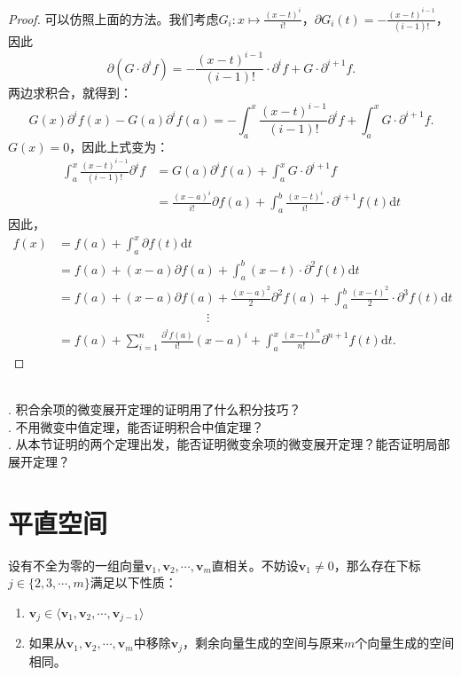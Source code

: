 \documentclass[12pt,UTF8,fontset=none]{ctexbook}
\begin{document}
\begin{appendix}
\begin{proof}
    可以仿照上面的方法。我们考虑$G_i: x\mapsto \frac{(x - t)^i}{i!}$，$\partial G_i(t) = -\frac{(x - t)^{i-1}}{(i-1)!}$，
    因此
    $$ \partial (G\cdot \partial^i f) = -\frac{(x - t)^{i-1}}{(i-1)!} \cdot \partial^i f + G \cdot \partial^{i+1} f. $$
    两边求积合，就得到：
    $$ G(x) \partial^i f(x) - G(a) \partial^i f(a) = - \int_a^x \frac{(x - t)^{i-1}}{(i-1)!} \partial^i f + \int_a^x G \cdot \partial^{i+1} f. $$
    $G(x) = 0$，因此上式变为：
    \begin{align*}
        \int_a^x \frac{(x - t)^{i-1}}{(i-1)!}\partial^i f & = G(a) \partial^i f(a)  + \int_a^x G \cdot \partial^{i+1} f \\
        & = \frac{(x - a)^i}{i!} \partial f(a) + \int_a^b \frac{(x - t)^i}{i!}\cdot \partial^{i+1} f(t)\mathrm{d}t
    \end{align*}
    因此，
    \begin{align*}
        f(x) &= f(a) + \int_a^x \partial f(t) \mathrm{d}t \\
        &= f(a) + (x - a) \partial f(a) + \int_a^b (x - t) \cdot \partial^2 f(t) \mathrm{d}t \\
        &= f(a) + (x - a) \partial f(a) + \frac{(x - a)^2}{2} \partial^2 f(a) + \int_a^b \frac{(x - t)^2}{2} \cdot \partial^3 f(t) \mathrm{d}t\\
        & \qquad \qquad \qquad \qquad\qquad \qquad \vdots \\
        &= f(a) + \sum_{i=1}^n \frac{\partial^i f(a)}{i!} (x - a)^i + \int_a^x \frac{(x - t)^{n}}{n!} \partial^{n+1} f(t)\mathrm{d}t. 
    \end{align*}    
\end{proof}

\begin{sk}
    \mbox{} \\
    . 积合余项的微变展开定理的证明用了什么积分技巧？\\
    . 不用微变中值定理，能否证明积合中值定理？\\
    . 从本节证明的两个定理出发，能否证明微变余项的微变展开定理？能否证明局部展开定理？
\end{sk}

\chapter{平直空间}

\begin{tm}\label{tm:d-1-20}
    设有不全为零的一组向量$\mathbf{v}_1, \mathbf{v}_2 , \cdots , \mathbf{v}_m$直相关。不妨设$\mathbf{v}_1 \neq 0$，那么存在下标$j \in \{2,3, \cdots, m\}$满足以下性质：
    \begin{enumerate}
    \item $\mathbf{v}_j \in \langle \mathbf{v}_1, \mathbf{v}_2 , \cdots , \mathbf{v}_{j-1}\rangle$
    \item 如果从$\mathbf{v}_1, \mathbf{v}_2 , \cdots , \mathbf{v}_m$中移除$\mathbf{v}_j$，剩余向量生成的空间与原来$m$个向量生成的空间相同。
    \end{enumerate}
\end{tm}


\end{appendix}
\end{document}
